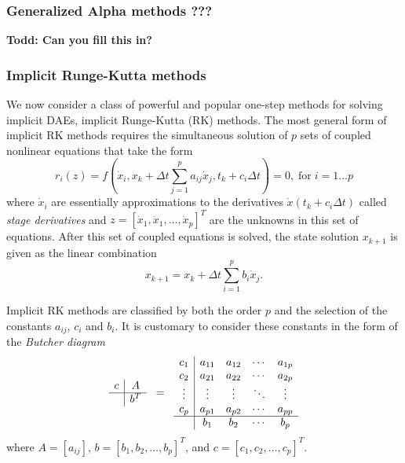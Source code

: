 \documentclass[pdf,ps2pdf,11pt]{SANDreport}
\begin{document}
\subsubsection{Generalized Alpha methods ???}

{}\textbf{Todd: Can you fill this in?}

\subsubsection{Implicit Runge-Kutta methods}

We now consider a class of powerful and popular one-step methods for solving
implicit DAEs, implicit Runge-Kutta (RK) methods.  The most general form
of implicit RK methods requires the simultaneous solution of $p$ sets
of coupled nonlinear equations that take the form
%
\begin{equation}
r_i(z) = f\left( \dot{x}_i, x_k + \Delta t \sum_{j=1}^{p} a_{ij} \dot{x}_j,
t_k + c_i \Delta t \right) = 0,
\; \mbox{for} \; i = 1 \ldots p
\label{rythmos:eqn:irk_dae_ne}
\end{equation}
%
where $\dot{x}_i$ are essentially approximations to the derivatives
$\dot{x}(t_k + c_i \Delta t)$ called {}\textit{stage derivatives} and $z = [
{}\dot{x}_1, {}\dot{x}_1, {}\ldots, {}\dot{x}_p ]^T$ are the unknowns in this
set of equations.  After this set of coupled equations is solved, the state
solution $x_{k+1}$ is given as the linear combination
%
\begin{equation}
x_{k+1} = x_k + \Delta t \sum_{i=1}^{p} b_i \dot{x}_j.
\end{equation}

Implicit RK methods are classified by both the order $p$ and the selection of
the constants $a_{ij}$, $c_i$ and $b_i$.  It is customary to consider these
constants in the form of the {}\textit{Butcher diagram}
%
\[
\begin{array}{c|c}
c & A \\
\hline
  & b^T
\end{array}
\; \; = \; \;
\begin{array}{c|cccc}
c_1 & a_{11} & a_{12} & \cdots & a_{1p} \\
c_2 & a_{21} & a_{22} & \cdots & a_{2p} \\
\vdots & \vdots & \vdots & \ddots & \vdots \\
c_p & a_{p1} & a_{p2} & \cdots & a_{pp} \\
\hline
 & b_1 & b_2 & \cdots & b_p
\end{array}
\]
%
where $A = [a_{ij}]$, $b = [b_1, b_2, {}\ldots, b_p]^T$, and $c =
[c_1, c_2, {}\ldots, c_p]^T$.
\end{document}
